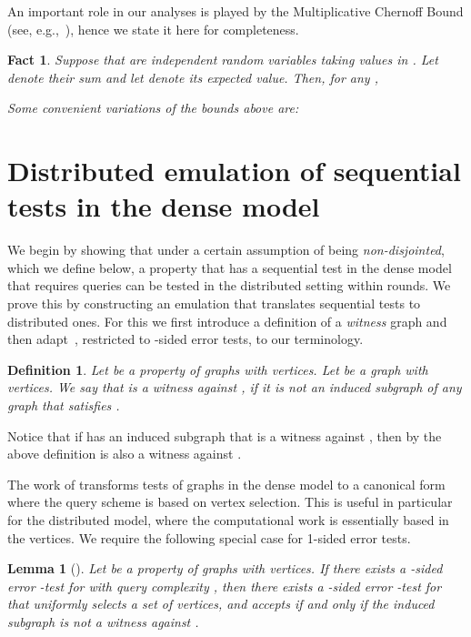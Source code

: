 \documentclass[11pt]{article}
\newtheorem{lemma}[theorem]{Lemma}
\newtheorem{definition}[theorem]{Definition}
\newtheorem{fact}[theorem]{Fact}
\begin{document}
An important role in our analyses is played by the Multiplicative Chernoff Bound (see, e.g.,~\cite{Mitzenmacher}), hence we state it here for completeness.
\begin{fact}
\label{fact:chernoff}
Suppose that  are independent random variables taking values in . Let  denote their sum and let  denote its expected value. Then, for any ,

Some convenient variations of the bounds above are:

\end{fact}



\section{Distributed emulation of sequential tests in the dense model}
\label{sec:emulation}
We begin by showing that under a certain assumption of being \emph{non-disjointed}, which we define below, a property  that has a sequential test in the dense model that requires  queries can be tested in the distributed setting within  rounds.
We prove this by constructing an emulation that translates sequential tests to distributed ones. For this we first introduce a definition of a \emph{witness} graph and then adapt~\cite[Theorem 2.2]{Goldreich}, restricted to -sided error tests, to our terminology.

\begin{definition}
\label{def:rejected-graph}
Let  be a property of graphs with  vertices. Let  be a graph with  vertices. We say that  is a \emph{witness against }, if it is not an induced subgraph of any graph that satisfies .		
\end{definition}
Notice that if  has an induced subgraph  that is a witness against , then by the above
definition  is also a witness against .\par
The work of \cite{Goldreich} transforms tests of graphs in the dense model to a canonical form where the query scheme is based on vertex selection. This is useful in particular for the distributed model, where the computational work is essentially based in the vertices. We require the following special case for 1-sided error tests.

\begin{lemma}[\textbf{\cite[Theorem 2.2]{Goldreich}}]
\label{claim:canonical-tester}
Let  be a property of graphs with  vertices.
If there exists a -sided error -test for  with query complexity , then there exists a -sided error -test for  that uniformly selects a set of  vertices, and accepts if and only if the induced subgraph is not a witness against .
\end{lemma}
\end{document}

